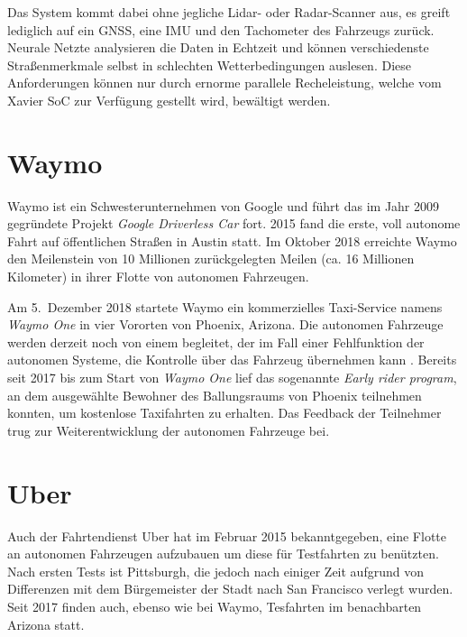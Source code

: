 Das System kommt dabei ohne jegliche \acs{Lidar}- oder \acs{Radar}-Scanner aus, es greift lediglich auf ein \ac{GNSS}, eine \ac{IMU} und den Tachometer des Fahrzeugs zurück. Neurale Netzte analysieren die Daten in Echtzeit und können verschiedenste Straßenmerkmale selbst in schlechten Wetterbedingungen auslesen. Diese Anforderungen können nur durch ernorme parallele Recheleistung, welche vom Xavier \ac{SoC} zur Verfügung gestellt wird, bewältigt werden. 


\section{Waymo}

Waymo ist ein Schwesterunternehmen von Google und führt das im Jahr 2009 gegründete Projekt \emph{Google Driverless Car} fort. 2015 fand die erste, voll autonome Fahrt auf öffentlichen Straßen in Austin statt. Im Oktober 2018 erreichte Waymo den Meilenstein von 10 Millionen zurückgelegten Meilen (ca. 16 Millionen Kilometer) in ihrer Flotte von autonomen Fahrzeugen.

Am 5.\ Dezember 2018 startete Waymo ein kommerzielles Taxi-Service namens \emph{Waymo One} in vier Vororten von Phoenix, Arizona. Die autonomen Fahrzeuge werden derzeit noch von einem  begleitet, der im Fall einer Fehlfunktion der autonomen Systeme, die Kontrolle über das Fahrzeug übernehmen kann . Bereits seit 2017 bis zum Start von \emph{Waymo One} lief das sogenannte \emph{Early rider program}, an dem ausgewählte Bewohner des Ballungsraums von Phoenix teilnehmen konnten, um kostenlose Taxifahrten zu erhalten. Das Feedback der Teilnehmer trug zur Weiterentwicklung der autonomen Fahrzeuge bei.


\section{Uber}

Auch der Fahrtendienst Uber hat im Februar 2015 bekanntgegeben, eine Flotte an autonomen Fahrzeugen aufzubauen um diese für Testfahrten zu benützten. Nach ersten Tests ist Pittsburgh, die jedoch nach einiger Zeit aufgrund von Differenzen mit dem Bürgemeister der Stadt nach San Francisco verlegt wurden. Seit 2017 finden auch, ebenso wie bei Waymo, Tesfahrten im benachbarten Arizona statt. 

